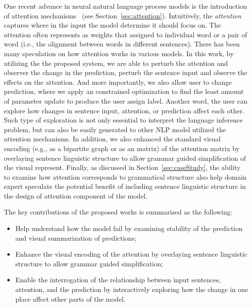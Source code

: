 One recent advance in neural natural language process models is the introduction of attention mechanisms~\cite{VaswaniShazeerParmar2017} (see Section~\ref{sec:attention}). Intuitively, the \emph{attention} captures where in the input the model determine it should focus on. The attention often represents as weights that assigned to individual word or a pair of word (i.e., the alignment between words in different sentences).
%
There has been many speculation on how attention works in various models. In this work, by utilizing the the proposed system, we are able to perturb the attention and observer the change in the prediction, perturb the sentence input and observe the effects on the attention. And more importantly, we also allow user to change prediction, where we apply an constrained optimization to find the least amount of parameter update to produce the user assign label. Another word, the user can explore how changes in sentence input, attention, or prediction affect each other. Such type of exploration is not only essential to interpret the language inference problem, but can also be easily generated to other NLP model utilized the attention mechanisms.
%
In addition, we also enhanced the standard visual encoding (e.g., as a bipartite graph or as an matrix) of the attention matrix by overlaying sentence linguistic structure to allow grammar guided simplification of the visual represent.
Finally, as discussed in Section~\ref{sec:caseStudy}, the ability to examine how attention corresponds to grammatical structure also help domain expert speculate the potential benefit of including sentence linguistic structure in the design of attention component of the model.


The key contributions of the proposed works is summarized as the following:
\begin{itemize}
    \item Help understand how the model fail by examining stability of the prediction and visual summarization of predictions;

    \item Enhance the visual encoding of the attention by overlaying sentence linguistic structure to allow grammar guided simplification;

    \item Enable the interrogation of the relationship between input sentences, attention, and the prediction by interactively exploring how the change in one place affect other parts of the model.

\end{itemize}
%

